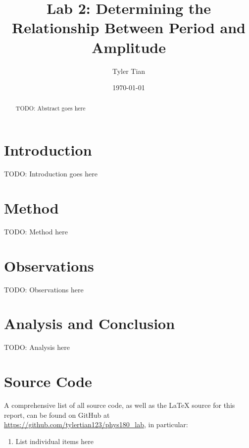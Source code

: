 \documentclass[aps,twocolumn,secnumarabic,nobalancelastpage,amsmath,amssymb,nofootinbib]{revtex4}
\begin{document}
\title{Lab 2: Determining the Relationship Between Period and Amplitude}
\author{Tyler Tian}
\date{\today}


\begin{abstract}
TODO: Abstract goes here
\end{abstract}

\maketitle


\section{Introduction}

TODO: Introduction goes here


\section{Method}

TODO: Method here


\section{Observations}

TODO: Observations here


\section{Analysis and Conclusion}

TODO: Analysis here


\appendix
\section{Source Code}

A comprehensive list of all source code, as well as the \LaTeX{} source for this report, can be found on GitHub at
\url{https://github.com/tylertian123/phys180_lab}, in particular:
\label{appendix:code}
\begin{enumerate}
    \item List individual items here
\end{enumerate}
\end{document}
